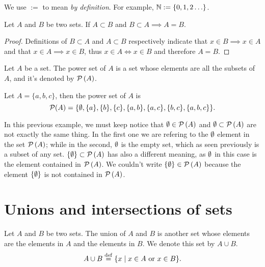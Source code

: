 \begin{notation}
    We use $:=$ to mean \textit{by definition}. For example, $\mathbb{N} := \{0, 1, 2\ldots\} $.
\end{notation}

\begin{prop}
    Let $A$ and $B$ be two sets. If $A\subset B$ and $B\subset A\implies A = B$.
\end{prop}
\begin{proof}
    Definitions of $B\subset A$ and $A\subset B$ respectively indicate that $x\in B\implies x\in A$ and that $x\in A\implies x\in B$, thus $x\in A\iff x\in B$ and therefore $A = B$.
\end{proof}

\begin{defi}
    Let $A$ be a set. The power set of $A$ is a set whose elements are all the subsets of $A$, and it's denoted by $\mathcal{P}\left( A \right) $.
\end{defi}

\begin{example}
    Let $A = \{a, b, c\}$, then the power set of $A$ is
    \begin{equation}
    \mathcal{P}(A) = \lbrace \emptyset, \{a\}, \{b\}, \{c\}, \{a, b\}, \{a, c\}, \{b, c\}, \{a, b, c\}\rbrace.
    \end{equation}
\end{example}

In this previous example, we must keep notice that $\emptyset\in\mathcal{P}\left( A \right)$ and $\emptyset\subset \mathcal{P}\left( A \right)$ are not exactly the same thing. In the first one we are refering to the $\emptyset$ element in the set $\mathcal{P}\left( A \right)$; while in the second, $\emptyset$ is the empty set, which as seen previously is a subset of any set. $\{\emptyset\}\subset \mathcal{P}\left( A \right)$ has also a different meaning, as $\emptyset$ in this case is the element contained in $\mathcal{P}\left( A \right)$. We couldn't write $\{\emptyset\}\in \mathcal{P}\left( A \right)$ because the element $\{\emptyset\}$ is not contained in $\mathcal{P}\left( A \right) $.

\section{Unions and intersections of sets}
\begin{defi}
    Let $A$ and $B$ be two sets. The union of $A$ and $B$ is another set whose elements are the elements in $A$ and the elements in $B$. We denote this set by $A\cup B$.
    \begin{equation}
        A\cup B \overset{\mathrm{def}}{=} \{x\; | \; x\in A\textrm{ or } x\in B\}.
    \end{equation}
\end{defi}

